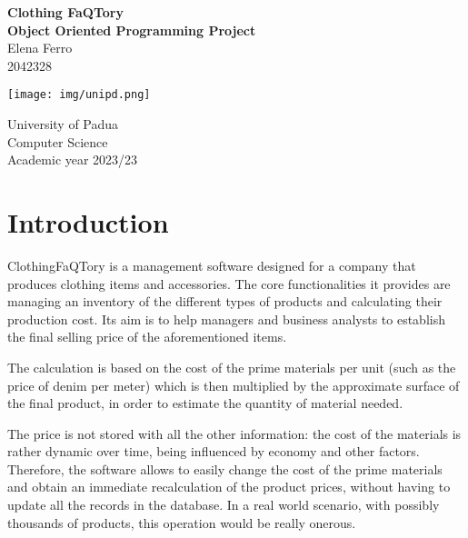 \documentclass[10pt]{article}
\begin{document}
\begin{titlepage}

    \begin{center}
        \vspace*{1cm}
        \Huge
        \textbf{Clothing FaQTory}\\
        \LARGE
        \textbf{Object Oriented Programming Project}\\
        \vspace{1cm}
        \Large
        Elena Ferro\\
        \large
        2042328

        \vspace{10cm}

        \texttt{[image: img/unipd.png]}

        \Large
        \vspace{1cm}
        University of Padua\\
        \vspace{0.3cm}
        {\large Computer Science\\}
        \vspace{0.3cm}
        Academic year 2023/23

    \end{center}
\end{titlepage}
\pagestyle{fancy}
\section{Introduction}
ClothingFaQTory is a management software designed for a company that produces
clothing items and accessories. The core functionalities it provides are
managing an inventory of the different types of products and calculating their
production cost. Its aim is to help managers and business analysts to establish
the final selling price of the aforementioned items.

The calculation is based on the cost of the prime materials per unit (such as
the price of denim per meter) which is then multiplied by the approximate
surface of the final product, in order to estimate the quantity of material
needed.

The price is not stored with all the other information: the cost of the
materials is rather dynamic over time, being influenced by economy and other
factors. Therefore, the software allows to easily change the cost of the prime
materials and obtain an immediate recalculation of the product prices, without
having to update all the records in the database. In a real world scenario,
with possibly thousands of products, this operation would be really onerous.
\end{document}
